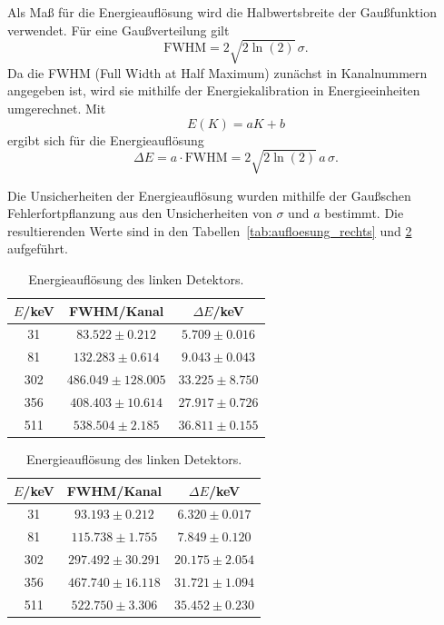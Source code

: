 Als Maß für die Energieauflösung wird die Halbwertsbreite der Gaußfunktion verwendet. 
Für eine Gaußverteilung gilt 
\[ \mathrm{FWHM}=2\sqrt{2\ln(2)}\,\sigma . \] 
Da die FWHM (Full Width at Half Maximum) zunächst in Kanalnummern angegeben ist, wird sie mithilfe der Energiekalibration in Energieeinheiten umgerechnet. 
Mit \[ E(K)=aK+b \] ergibt sich für die Energieauflösung \[ \Delta E = a\cdot \mathrm{FWHM} = 2\sqrt{2\ln(2)}\,a\,\sigma . \] 

Die Unsicherheiten der Energieauflösung wurden mithilfe der Gaußschen Fehlerfortpflanzung aus den Unsicherheiten von $\sigma$ und $a$ bestimmt. 
Die resultierenden Werte sind in den Tabellen~\ref{tab:aufloesung_rechts} und \ref{tab:aufloesung_links} aufgeführt. 

\begin{table}[htbp] 
    \centering 
    \begin{minipage}{0.48\textwidth} 
        \centering 
        \caption{Energieauflösung des rechten Detektors.} 
        \label{tab:aufloesung_rechts} 
        \begin{tabular}{c c c} 
            \hline 
            $E$/keV & FWHM/Kanal & $\Delta E$/keV \\ 
            \hline 
            31 & $83.522 \pm 0.212$ & $5.709 \pm 0.016$ \\ 
            81 & $132.283 \pm 0.614$ & $9.043 \pm 0.043$ \\ 
            302 & $486.049 \pm 128.005$ & $33.225 \pm 8.750$ \\ 
            356 & $408.403 \pm 10.614$ & $27.917 \pm 0.726$ \\ 
            511 & $538.504 \pm 2.185$ & $36.811 \pm 0.155$ \\ 
            \hline 
        \end{tabular} 
    \end{minipage} 
    \hfill 
    \begin{minipage}{0.48\textwidth} 
        \centering 
        \caption{Energieauflösung des linken Detektors.} 
        \label{tab:aufloesung_links} 
        \begin{tabular}{c c c} 
            \hline 
            $E$/keV & FWHM/Kanal & $\Delta E$/keV \\ 
            \hline 
            31 & $93.193 \pm 0.212$ & $6.320 \pm 0.017$ \\ 
            81 & $115.738 \pm 1.755$ & $7.849 \pm 0.120$ \\ 
            302 & $297.492 \pm 30.291$ & $20.175 \pm 2.054$ \\ 
            356 & $467.740 \pm 16.118$ & $31.721 \pm 1.094$ \\ 
            511 & $522.750 \pm 3.306$ & $35.452 \pm 0.230$ \\ 
            \hline 
        \end{tabular} 
    \end{minipage} 
\end{table} 

